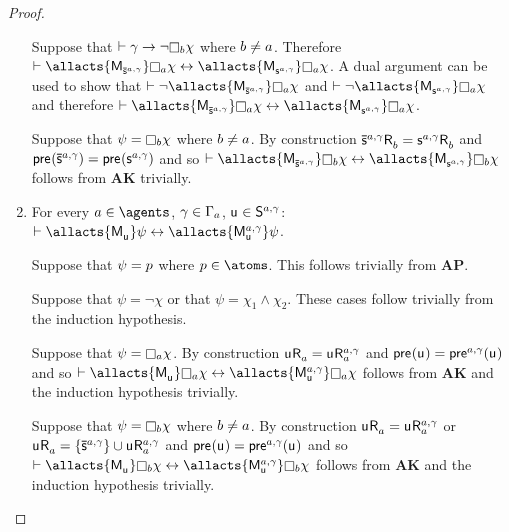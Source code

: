 \begin{proof}
\begin{enumerate}
        Suppose that $\proves \gamma \implies \neg \necessaryB \chi$ where $b \neq a$.
        Therefore $\proves \allacts{\aPModel{\aPStateS[\agentA,\gamma]}} \necessaryA \chi \iff \allacts{\aPModel{\aStateS[\agentA,\gamma]}} \necessaryA \chi$.
        A dual argument can be used to show that $\proves \neg \allacts{\aPModel{\aPStateS[\agentA,\gamma]}} \necessaryA \chi$ and $\proves \neg \allacts{\aPModel{\aStateS[\agentA,\gamma]}} \necessaryA \chi$ and therefore $\proves \allacts{\aPModel{\aPStateS[\agentA,\gamma]}} \necessaryA \chi \iff \allacts{\aPModel{\aStateS[\agentA,\gamma]}} \necessaryA \chi$.

        Suppose that $\psi = \necessaryB \chi$ where $b \neq a$.
        By construction $\aPStateS[\agentA,\gamma] \aAccessibility{\agentB} = \aStateS[\agentA,\gamma] \aAccessibility{\agentB}$ and $\aPrecondition(\aPStateS[\agentA,\gamma]) = \aPrecondition(\aStateS[\agentA,\gamma])$ and so $\proves \allacts{\aPModel{\aPStateS[\agentA,\gamma]}} \necessaryB \chi \iff \allacts{\aPModel{\aStateS[\agentA,\gamma]}} \necessaryB \chi$ follows from {\bf AK} trivially.

    \item For every $\agentA \in \agents$, $\gamma \in \Gamma_a$, $\aStateU \in \aStates[\agentA,\gamma]$: $\proves \allacts{\aPModel{\aStateU}} \psi \iff \allacts{\aPModel[\agentA,\gamma]{\aStateU}} \psi$.

        Suppose that $\psi = p$ where $\atomP \in \atoms$. 
        This follows trivially from {\bf AP}.

        Suppose that $\psi = \neg \chi$ or that $\psi = \chi_1 \land \chi_2$. These cases follow trivially from the induction hypothesis.

        Suppose that $\psi = \necessaryA \chi$.
        By construction $\aStateU \aAccessibility{\agentA} = \aStateU \aAccessibility[\agentA,\gamma]{\agentA}$ and $\aPrecondition(\aStateU) = \aPrecondition[\agentA,\gamma](\aStateU)$ and so $\proves \allacts{\aPModel{\aStateU}} \necessaryA \chi \iff \allacts{\aPModel[\agentA,\gamma]{\aStateU}} \necessaryA \chi$ follows from {\bf AK} and the induction hypothesis trivially.

        Suppose that $\psi = \necessaryB \chi$ where $b \neq a$.
        By construction $\aStateU \aAccessibility{\agentA} = \aStateU \aAccessibility[\agentA,\gamma]{\agentA}$ or $\aStateU \aAccessibility{\agentA} = \{\aPStateS[\agentA,\gamma]\} \cup \aStateU \aAccessibility[\agentA,\gamma]{\agentA}$ and $\aPrecondition(\aStateU) = \aPrecondition[\agentA,\gamma](\aStateU)$ and so $\proves \allacts{\aPModel{\aStateU}} \necessaryB \chi \iff \allacts{\aPModel[\agentA,\gamma]{\aStateU}} \necessaryB \chi$ follows from {\bf AK} and the induction hypothesis trivially.
\end{enumerate}


\end{proof}
